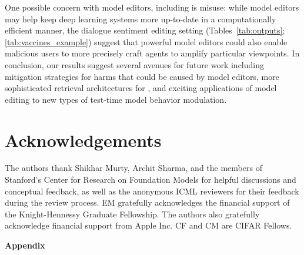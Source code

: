 \documentclass{article}
\begin{document}
One possible concern with model editors, including {\name} is misuse: while model editors may help keep deep learning systems more up-to-date in a computationally efficient manner, the dialogue sentiment editing setting (Tables~\ref{tab:outputs}; \ref{tab:vaccines_example}) suggest that powerful model editors could also enable malicious users to more precisely craft agents to amplify particular viewpoints. In conclusion, our results suggest several avenues for future work including mitigation strategies for harms that could be caused by model editors, more sophisticated retrieval architectures for {\name},  and exciting applications of model editing to new types of test-time model behavior modulation.


\section{Acknowledgements}

The authors thank Shikhar Murty, Archit Sharma, and the members of Stanford's Center for Research on Foundation Models for helpful discussions and conceptual feedback, as well as the anonymous ICML reviewers for their feedback during the review process. EM gratefully acknowledges the financial support of the  Knight-Hennessy Graduate Fellowship. The authors also gratefully acknowledge financial support from Apple Inc. CF and CM are CIFAR Fellows.

\clearpage



\clearpage


\appendix

{\LARGE \textbf{Appendix}}




\end{document}
